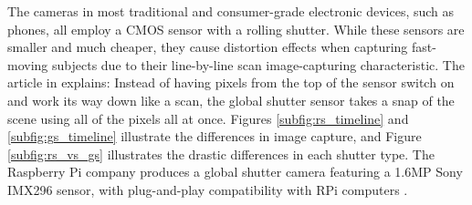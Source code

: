 The cameras in most traditional and consumer-grade electronic devices, such as phones, all employ a CMOS sensor with a rolling shutter. While these sensors are smaller and much cheaper, they cause distortion effects when capturing fast-moving subjects due to their line-by-line scan image-capturing characteristic. The article in \cite{updatedWhatGlobalShutter2021} explains: Instead of having pixels from the top of the sensor switch on and work its way down like a scan, the global shutter sensor takes a snap of the scene using all of the pixels all at once. Figures \ref{subfig:rs_timeline} and \ref{subfig:gs_timeline} illustrate the differences in image capture, and Figure \ref{subfig:rs_vs_gs} illustrates the drastic differences in each shutter type. The Raspberry Pi company produces a global shutter camera featuring a 1.6MP Sony IMX296 sensor, with plug-and-play compatibility with RPi computers \cite{raspberrypiltdBuyRaspberryPib}.


